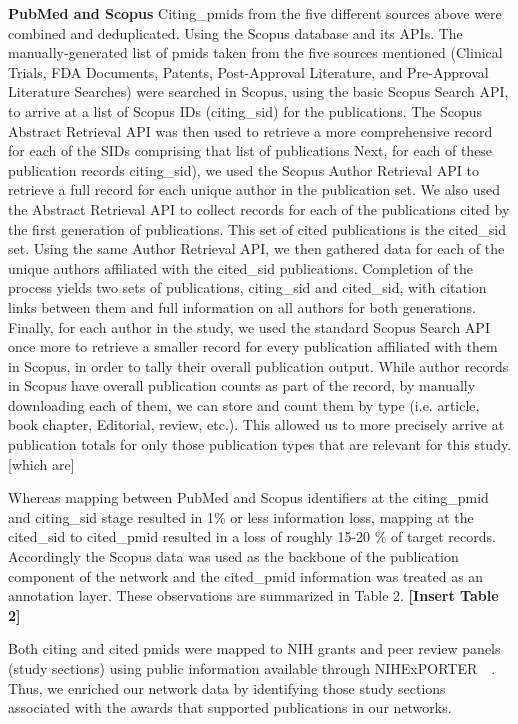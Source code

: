 \documentclass[10pt,letterpaper]{article}
\begin{document}
\textbf{PubMed and Scopus} Citing\_pmids from the five different sources above  were combined and deduplicated. Using the Scopus database and its APIs. The manually-generated list of pmids taken from the five sources mentioned (Clinical Trials, FDA Documents, Patents, Post-Approval Literature, and Pre-Approval Literature Searches) were searched in Scopus, using the basic Scopus Search API, to arrive at a list of Scopus IDs (citing\_sid) for the publications. The Scopus Abstract Retrieval API was then used to retrieve a more comprehensive record for each of the SIDs comprising that list of publications Next, for each of these publication records citing\_sid), we used the Scopus Author Retrieval API to retrieve a full record for each unique author in the  publication set. We also used the Abstract Retrieval API to collect records for each of the publications cited by the first generation of publications. This set of cited publications is the cited\_sid set.  Using the same Author Retrieval API, we then gathered data for each of the unique authors affiliated with the cited\_sid publications. Completion of the process yields two sets of publications, citing\_sid and cited\_sid, with citation links between them and full information on all authors for both generations. Finally, for each author in the study, we used the standard Scopus Search API once more to retrieve a smaller record for every publication affiliated with them in Scopus, in order to tally their overall publication output. While author records in Scopus have overall publication counts as part of the record, by manually downloading each of them, we can store and count them by type (i.e. article, book chapter, Editorial, review, etc.). This allowed us to more precisely arrive at publication totals for only those publication types that are relevant for this study. [which are]

Whereas mapping between PubMed and Scopus identifiers at the citing\_pmid and citing\_sid stage resulted in 1\% or less information loss, mapping at the cited\_sid to cited\_pmid resulted in a loss of roughly 15-20 \% of target records. Accordingly the Scopus data  was used as the backbone of the publication component of the network and the cited\_pmid information was treated as an annotation layer.  These observations are summarized in Table 2. \textbf{[Insert Table 2]}

Both citing and cited pmids were mapped to NIH grants and peer review panels (study sections) using public information available through NIHExPORTER~~\cite{bibNIHExPORTER}. Thus, we enriched our network data by identifying those study sections associated with the awards that supported publications in our networks. 
\end{document}
